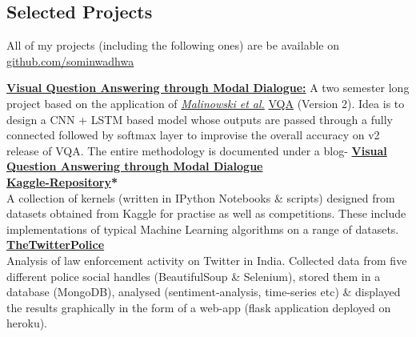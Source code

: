 \documentclass[margin,line]{res}
\begin{document}
\begin{resume}
\section{\sc Selected Projects}
All of my projects (including the following ones) are be available on {\href{https://github.com/sominwadhwa}{\underline{github.com/sominwadhwa}}}

{\bf {\href{https://github.com/sominwadhwa/VQAMD}{\underline{Visual Question Answering through Modal Dialogue}:}}}
A two semester long project based on the application of \textit{\href{https://arxiv.org/pdf/1505.01121.pdf}{Malinowski et al.}} {\href{http://visualqa.org/}{\color{blue} VQA}} (Version 2). Idea is to design a CNN + LSTM based model whose outputs are passed through a fully connected followed by softmax layer to improvise the overall accuracy on v2 release of VQA. The entire methodology is documented under a blog- {\bf {\href{http://www.swadhwa.me/blog/2018/01/01/de/}{\color{blue} Visual Question Answering through Modal Dialogue}}}\\
{\bf {\href{https://github.com/sominwadhwa/Kaggle}{\color{blue} Kaggle-Repository}*}}\\
A collection of kernels (written in IPython Notebooks \& scripts) designed from datasets obtained from Kaggle for practise as well as competitions. These include implementations of typical Machine Learning algorithms on a range of datasets.\\
{\bf {\href{https://github.com/sominwadhwa/TheTwitterPolice}{\color{blue} TheTwitterPolice}}}\\
Analysis of law enforcement activity on Twitter in India. Collected data from five different police social handles (BeautifulSoup \& Selenium), stored them in a database (MongoDB), analysed (sentiment-analysis, time-series etc) \& displayed the results graphically in the form of a web-app (flask application deployed on heroku).

\iffalse
\section{\sc Technical Skills}
{\bf Strongest Areas}: Machine Learning (Classification, Regression, Feature Engineering), Algorithms, Statistical Data Analysis\\
{\bf Languages/Tools/Software}: Python (scikit-learn, Keras, NumPy, Pandas \& others), Java, SQL, MongoDB, \LaTeX, MS Excel
\fi


\end{resume}
\end{document}
